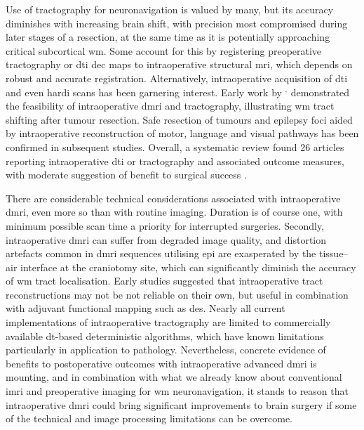 Use of tractography for neuronavigation is valued by many, but its accuracy diminishes with increasing brain shift, with precision most compromised during later stages of a resection, at the same time as it is potentially approaching critical subcortical \gls{wm}\autocite{Yang2019}.
Some account for this by registering preoperative tractography or \gls{dti} \gls{dec} maps to intraoperative structural \gls{mri}\autocite{Nimsky2006a,Tamura2022}, which depends on robust and accurate registration\autocite{Beare2016}.
Alternatively, intraoperative acquisition of \gls{dti} and even \gls{hardi} scans has been garnering interest.
Early work by \textcite{Nimsky2005}$^,$\autocite{Nimsky2005a} demonstrated the feasibility of intraoperative \gls{dmri} and tractography, illustrating \gls{wm} tract shifting after tumour resection.
Safe resection of tumours and epilepsy foci aided by intraoperative reconstruction of motor\autocite{Maesawa2010,Javadi2017}, language\autocite{DAndrea2016,Li2021} and visual\autocite{Daga2012,Cui2015} pathways has been confirmed in subsequent studies.
Overall, a systematic review found 26 articles reporting intraoperative \gls{dti} or tractography and associated outcome measures, with moderate suggestion of benefit to surgical success .

There are considerable technical considerations associated with intraoperative \gls{dmri}, even more so than with routine imaging.
Duration is of course one, with minimum possible scan time a priority for interrupted surgeries.
Secondly, intraoperative \gls{dmri} can suffer from degraded image quality\autocite{Roder2019}, and distortion artefacts common in \gls{dmri} sequences utilising \gls{epi} are exasperated by the tissue--air interface at the craniotomy site\autocite{Elliott2020}, which can significantly diminish the accuracy of \gls{wm} tract localisation\autocite{Yang2022}.
Early studies suggested that intraoperative tract reconstructions may not be not reliable on their own, but useful in combination with adjuvant functional mapping such as \gls{des}\autocite{Ostry2013}.
Nearly all current implementations of intraoperative tractography are limited to commercially available \gls{dt}-based deterministic algorithms, which have known limitations particularly in application to pathology.
Nevertheless, concrete evidence of benefits to postoperative outcomes with intraoperative advanced \gls{dmri} is mounting\autocite{DAndrea2012,Cui2015,Maesawa2010}, and in combination with what we already know about conventional \gls{imri} and preoperative imaging for \gls{wm} neuronavigation, it stands to reason that intraoperative \gls{dmri} could bring significant improvements to brain surgery if some of the technical and image processing limitations can be overcome.

